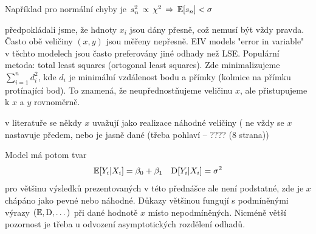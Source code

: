 Například pro normální chyby je $ s_{n}^{2} \, \propto \, \chi^{2} \, \Rightarrow \, \mathbb{E} [s_{n}] < \sigma $

\begin{remark}
	předpokládali jsme, že hdnoty $ x_{i} $ jsou dány přesně, což nemusí být vždy pravda. Často obě veličiny $ (x,y) $ jsou měřeny nepřesně. EIV models "error in variable" v těchto modelech jsou často preferovány jiné odhady než LSE. Populární metoda: total least squares (ortogonal least squares). Zde minimalizujeme $ \sum_{i=1}^{n} d_{i}^{2} $, kde $ d_{i} $ je minimální vzdálenost bodu a přímky (kolmice na přímku protínající bod). To znamená, že neupřednostňujeme veličinu $ x $, ale přistupujeme k $ x $ a $ y $ rovnoměrně.
\end{remark}
\begin{center}
    
\end{center}

\begin{remark}
v literatuře se někdy $ x $ uvažují jako realizace náhodné veličiny ( ne vždy se $ x $ nastavuje předem, nebo je jasně dané (třeba pohlaví -- ???? (8 strana)) 
\end{remark}
Model má potom tvar
$$
 \mathbb{E} [ Y_{i} \vert X_{i} ] = \beta_{0} + \beta_{1} \quad  \mathrm{D} [ Y_{i} \vert X_{i} ] = \sigma^{2}
$$
pro většinu výsledků prezentovaných v této přednášce ale není podstatné, zde je $ x $ chápáno jako pevné nebo náhodné.
Důkazy většinou fungují s podmíněnými výrazy $ ( \mathbb{E} , \mathrm{D} , \dots )  $ při dané hodnotě $ x $ místo nepodmíněných.
Nicméně větší pozornost je třeba u odvození asymptotických rozdělení odhadů.

